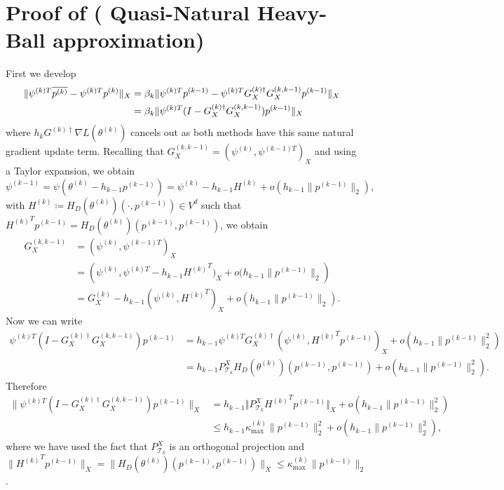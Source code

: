 \documentclass{article}
\theoremstyle{noparens}
\newcommand{\cT}{\mathcal{T}}
\newcommand{\paramk}{\theta^{(k)}}
\newcommand{\psik}{\psi^{(k)}}
\newcommand{\psikm}{\psi^{(k-1)}}
\newcommand{\psikT}{\psi^{(k)T}}
\newcommand{\psikmT}{\psi^{(k-1)T}}
\newcommand{\pk}{p^{(k)}}
\newcommand{\pkm}{p^{(k-1)}}
\newcommand{\Ginvk}{{G^{(k)\dagger}}}
\newcommand{\GXk}{{G^{(k)}_X}}
\newcommand{\GXinvk}{{G^{(k)\dagger}_X}}
\newcommand{\GXkkm}{{G^{(k,k-1)}_X}}
\newcommand{\Kmax}{\kappa^{(k)}_{\text{max}}}
\newcommand{\Hk}{{H^{(k)}}}
\begin{document}
\section{Proof of  (
Quasi-Natural Heavy-Ball approximation)}
\label{sec:proof-qnhb}
First we develop
\begin{align}
\|\psikT\overline{\pk}-\psikT\pk\|_X &= \beta_k\|\psikT\pkm-\psikT\GXinvk\GXkkm\pkm\|_X \notag\\
&= \beta_k\|\psikT(I-\GXinvk\GXkkm) \pkm\|_X \label{eq:IGG}
\end{align}
where $h_k \Ginvk\nabla L(\paramk)$ cancels out as both methods have this same natural gradient update term. Recalling that $\GXkkm=({\psik, \psikmT})_X$ and using a Taylor expansion, we obtain
$$\psikm = \psi(\paramk - h_{k-1}\pkm) = \psik - h_{k-1}\Hk  + o(h_{k-1}\|\pkm\|_2),$$
with $\Hk\coloneqq H_D(\paramk)(\cdot, \pkm)\in V^d$ such that $\Hk^T \pkm = H_D(\paramk)(\pkm, \pkm)$, we obtain
\begin{align*}
\GXkkm
&=({\psik,\psikmT})_X\\
&=({\psik, \psikT - h_{k-1}\Hk^T)_X + o(h_{k-1}\|\pkm\|_2})\\
&=\GXk - h_{k-1}({\psik, \Hk^T})_X + o(h_{k-1}\|\pkm\|_2).
\end{align*}
Now we can write
\begin{align*}
    \psikT\left(I-\GXinvk\GXkkm\right)\pkm
    &=  h_{k-1}\psikT\GXinvk({\psik,\Hk^T \pkm})_X + o(h_{k-1}\|\pkm\|^2_2) \\
    &= h_{k-1} P_{\cT_k}^X H_D(\paramk)(\pkm,\pkm)  + o(h_{k-1}\|\pkm\|^2_2).
\end{align*}
Therefore
\begin{align*}
    \|\psikT(I-\GXinvk\GXkkm) \pkm\|_X
   &=  h_{k-1} \Vert P_{\cT_k}^X \Hk^T \pkm \Vert_X +  o(h_{k-1}\|\pkm\|^2_2) \\
   &\le h_{k-1} \Kmax \|\pkm\|^2_2 + o(h_{k-1} \|\pkm\|^2_2),
\end{align*}
where we have used the fact that $P_{\cT_k}^X$ is an orthogonal projection and  $\| \Hk^T \pkm \|_X = \|H_D(\paramk)(\pkm, \pkm)\|_X \leq \Kmax \|\pkm\|_2$.



\end{document}
